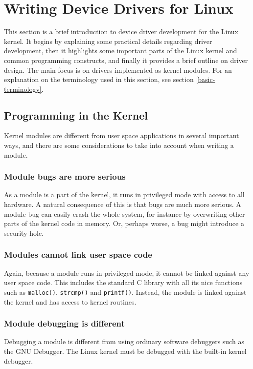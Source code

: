 \section{Writing Device Drivers for Linux}\label{writing-device-drivers-for-linux}
This section is a brief introduction to device driver development for the Linux kernel. It begins by explaining some practical details regarding driver development, then it highlights some important parts of the Linux kernel and common programming constructs, and finally it provides a brief outline on driver design. The main focus is on drivers implemented as kernel modules. For an explanation on the terminology used in this section, see section \ref{basic-terminology}.



\subsection{Programming in the Kernel}
Kernel modules are different from user space applications in several important ways, and there are some considerations to take into account when writing a module.

\subsubsection{Module bugs are more serious}
As a module is a part of the kernel, it runs in privileged mode with access to all hardware. A natural consequence of this is that bugs are much more serious. A module bug can easily crash the whole system, for instance by overwriting other parts of the kernel code in memory. Or, perhaps worse, a bug might introduce a security hole.

\subsubsection{Modules cannot link user space code}
Again, because a module runs in privileged mode, it cannot be linked against any user space code. This includes the standard C library with all its nice functions such as \texttt{malloc()}, \texttt{strcmp()} and \texttt{printf()}. Instead, the module is linked against the kernel and has access to kernel routines.

\subsubsection{Module debugging is different}
Debugging a module is different from using ordinary software debuggers such as the GNU Debugger. The Linux kernel must be debugged with the built-in kernel debugger.

